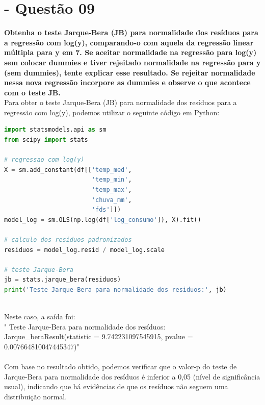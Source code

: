 \documentclass[a4paper, 12pt]{article}
\begin{document}
\section{- Questão 09}
\textbf{Obtenha o teste Jarque-Bera (JB) para normalidade dos resíduos para a regressão com log(y),
comparando-o com aquela da regressão linear múltipla para y em 7. Se aceitar normalidade
na regressão para log(y) sem colocar dummies e tiver rejeitado normalidade na regressão
para y (sem dummies), tente explicar esse resultado. Se rejeitar normalidade nessa nova
regressão incorpore as dummies e observe o que acontece com o teste JB. } \\

Para obter o teste Jarque-Bera (JB) para normalidade dos resíduos para a regressão com log(y), podemos utilizar o seguinte código em Python:\\


\begin{tcolorbox}[colback=white,boxrule=1pt,arc=5pt,auto outer arc]
  \begin{lstlisting}[language=Python]
import statsmodels.api as sm
from scipy import stats

# regressao com log(y)
X = sm.add_constant(df[['temp_med', 
                        'temp_min', 
                        'temp_max', 
                        'chuva_mm', 
                        'fds']])
model_log = sm.OLS(np.log(df['log_consumo']), X).fit()

# calculo dos residuos padronizados
residuos = model_log.resid / model_log.scale

# teste Jarque-Bera
jb = stats.jarque_bera(residuos)
print('Teste Jarque-Bera para normalidade dos residuos:', jb)
    \end{lstlisting}
\end{tcolorbox} \\

Neste caso, a saída foi:\\

" Teste Jarque-Bera para normalidade dos resíduos:\\ Jarque\_beraResult(statistic = 9.742231097545915, pvalue = 0.007664810047445347)" \\ \\

Com base no resultado obtido, podemos verificar que o valor-p do teste de Jarque-Bera para normalidade dos resíduos é inferior a 0,05 (nível de significância usual), indicando que há evidências de que os resíduos não seguem uma distribuição normal.\\
\end{document}
